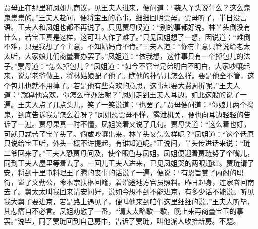 \begin{parag}
    贾母正在那里和凤姐儿商议，见王夫人进来，便问道：“袭人丫头说什么？这么鬼鬼祟祟的。”王夫人趁问，便将宝玉的心事，细细回明贾母。贾母听了，半日没言语。王夫人和凤姐也都不再说了。只见贾母叹道：“别的事都好说。林丫头倒没有什么，若宝玉真是这样，这可叫人作了难了。”只见凤姐想了一想，因说道：“难倒不难，只是我想了个主意，不知姑妈肯不肯。”王夫人道：“你有主意只管说给老太太听，大家娘儿们商量着办罢了。”凤姐道：“依我想，这件事只有一个掉包儿的法子。”贾母道：“怎么掉包儿？”凤姐道：“如今不管宝兄弟明白不明白，大家吵嚷起来，说是老爷做主，将林姑娘配了他了。瞧他的神情儿怎么样。要是他全不管，这个包儿也就不用掉了。若是他有些喜欢的意思，这事却要大费周折呢。”王夫人道：“就算他喜欢，你怎么样办法呢？”凤姐走到王夫人耳边，如此这般的说了一遍。王夫人点了几点头儿，笑了一笑说道：“也罢了。”贾母便问道：“你娘儿两个捣鬼，到底告诉我是怎么着呀？”凤姐恐贾母不懂，露泄机关，便也向耳边轻轻的告诉了一遍。贾母果真一时不懂，凤姐笑着又说了几句。贾母笑道：“这么着也好，可就只忒苦了宝丫头了。倘或吵嚷出来，林丫头又怎么样呢？”凤姐道：“这个话原只说给宝玉听，外头一概不许提起，有谁知道呢。”正说间，丫头传进话来说：“琏二爷回来了。”王夫人恐贾母问及，使个眼色与凤姐。凤姐便迎着贾琏努了个嘴儿，同到王夫人屋里等着去了。一回儿王夫人进来，已见凤姐哭的两眼通红。贾琏请了安，将到十里屯料理王子腾的丧事的话说了一遍，便说：“有恩旨赏了内阁的职衔，谥了文勤公，命本宗扶柩回籍，着沿途地方官员照料。昨日起身，连家眷回南去了。舅太太叫我回来请安问好，说如今想不到不能进京，有多少话不能说。听见我大舅子要进京，若是路上遇见了，便叫他来到咱们这里细细的说。”王夫人听毕，其悲痛自不必言。凤姐劝慰了一番，“请太太略歇一歇，晚上来再商量宝玉的事罢。”说毕，同了贾琏回到自己房中，告诉了贾琏，叫他派人收拾新房。不题。
\end{parag}


